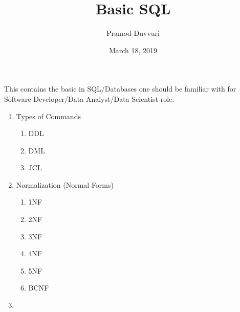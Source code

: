 \documentclass[11pt]{article}
\title{Basic SQL}
\author{Pramod Duvvuri}
\date{March 18, 2019}
\begin{document}
	\maketitle
	This contains the basic in SQL/Databases one should be familiar with for Software Developer/Data Analyst/Data Scientist role.
	\begin{enumerate}
	\item Types of Commands
	\begin{enumerate}
		\item DDL
		\item DML
		\item JCL
	\end{enumerate}	
	\item Normalization (Normal Forms)
	\begin{enumerate}
		\item 1NF
		\item 2NF
		\item 3NF
		\item 4NF
		\item 5NF
		\item BCNF		
	\end{enumerate}
    \item
\end{enumerate}
\end{document}
